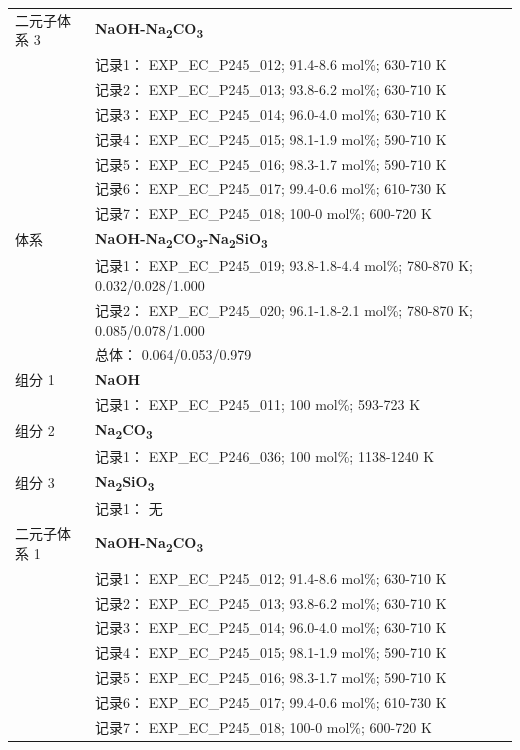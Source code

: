 \documentclass[12pt]{article}
\begin{document}
{\begin{longtable}[]{@{}
  >{\raggedright\arraybackslash}p{}
  >{\raggedright\arraybackslash}p{}@{}}
二元子体系 3  & \textbf{NaOH-Na\textsubscript{2}CO\textsubscript{3}} \\
 & 记录1： EXP\_EC\_P245\_012; 91.4-8.6 mol\%; 630-710 K \\
 & 记录2： EXP\_EC\_P245\_013; 93.8-6.2 mol\%; 630-710 K \\
 & 记录3： EXP\_EC\_P245\_014; 96.0-4.0 mol\%; 630-710 K \\
 & 记录4： EXP\_EC\_P245\_015; 98.1-1.9 mol\%; 590-710 K \\
 & 记录5： EXP\_EC\_P245\_016; 98.3-1.7 mol\%; 590-710 K \\
 & 记录6： EXP\_EC\_P245\_017; 99.4-0.6 mol\%; 610-730 K \\
 & 记录7： EXP\_EC\_P245\_018; 100-0 mol\%; 600-720 K  \\

\midrule
体系 & \textbf{NaOH-Na\textsubscript{2}CO\textsubscript{3}-Na\textsubscript{2}SiO\textsubscript{3}} \\
 & 记录1： EXP\_EC\_P245\_019; 93.8-1.8-4.4 mol\%; 780-870 K; 0.032/0.028/1.000 \\
 & 记录2： EXP\_EC\_P245\_020; 96.1-1.8-2.1 mol\%; 780-870 K; 0.085/0.078/1.000 \\
 & 总体： 0.064/0.053/0.979  \\

组分 1  & \textbf{NaOH} \\
 & 记录1： EXP\_EC\_P245\_011; 100 mol\%; 593-723 K  \\

组分 2  & \textbf{Na\textsubscript{2}CO\textsubscript{3}} \\
 & 记录1： EXP\_EC\_P246\_036; 100 mol\%; 1138-1240 K  \\

组分 3 & \textbf{Na\textsubscript{2}SiO\textsubscript{3}} \\
 & 记录1： 无 \\
二元子体系 1  & \textbf{NaOH-Na\textsubscript{2}CO\textsubscript{3}} \\
 & 记录1： EXP\_EC\_P245\_012; 91.4-8.6 mol\%; 630-710 K \\
 & 记录2： EXP\_EC\_P245\_013; 93.8-6.2 mol\%; 630-710 K \\
 & 记录3： EXP\_EC\_P245\_014; 96.0-4.0 mol\%; 630-710 K \\
 & 记录4： EXP\_EC\_P245\_015; 98.1-1.9 mol\%; 590-710 K \\
 & 记录5： EXP\_EC\_P245\_016; 98.3-1.7 mol\%; 590-710 K \\
 & 记录6： EXP\_EC\_P245\_017; 99.4-0.6 mol\%; 610-730 K \\
 & 记录7： EXP\_EC\_P245\_018; 100-0 mol\%; 600-720 K  \\


\end{longtable}}
\end{document}
